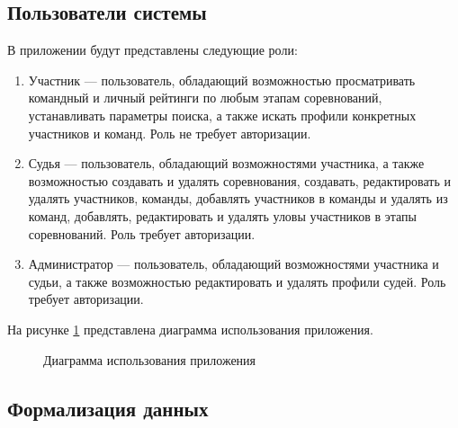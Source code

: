 \subsection{Пользователи системы}

В приложении будут представлены следующие роли:
\begin{enumerate}
	\item Участник --- пользователь, обладающий возможностью просматривать командный и личный рейтинги по любым этапам соревнований, устанавливать параметры поиска, а также искать профили конкретных участников и команд. Роль не требует авторизации.
	\item Судья — пользователь, обладающий возможностями участника, а также возможностью создавать и удалять соревнования, создавать, редактировать и удалять участников, команды, добавлять участников в команды и удалять из команд, добавлять, редактировать и удалять уловы участников в этапы соревнований. Роль требует авторизации.
	\item Администратор --- пользователь, обладающий возможностями участника и судьи, а также возможностью редактировать и удалять профили судей. Роль требует авторизации.
\end{enumerate}

На рисунке \ref{fig:UseCase} представлена диаграмма использования приложения.

\begin{figure}[h!]
	\caption{Диаграмма использования приложения}
	\label{fig:UseCase}
\end{figure}

\subsection{Формализация данных}


